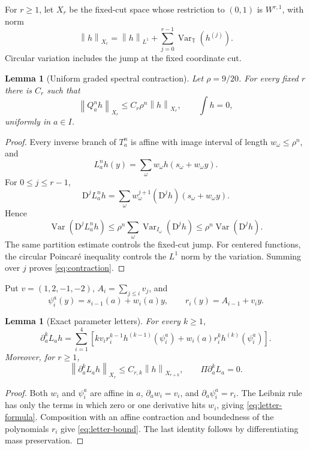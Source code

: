 \documentclass[11pt,reqno]{amsart}
\newtheorem{lemma}[theorem]{Lemma}
\theoremstyle{definition}
\theoremstyle{remark}
\newcommand{\D}{\mathrm D}
\newcommand{\T}{\mathbb T}
\newcommand{\Var}{\operatorname{Var}}
\newcommand{\norm}[1]{\left\lVert #1\right\rVert}
\begin{document}
For $r\ge1$, let $X_r$ be the fixed-cut space whose restriction to $(0,1)$ is
$W^{r,1}$, with norm
\begin{equation}\label{eq:Xr}
 \norm{h}_{X_r}=\norm{h}_{L^1}+
 \sum_{j=0}^{r-1}\Var_{\T}(h^{(j)}).
\end{equation}
Circular variation includes the jump at the fixed coordinate cut.

\begin{lemma}[Uniform graded spectral contraction]\label{lem:contraction}
Let $\rho=9/20$.  For every fixed $r$ there is $C_r$ such that
\begin{equation}\label{eq:contraction}
 \norm{Q_a^n h}_{X_r}\le C_r\rho^n\norm{h}_{X_r},
 \qquad \int h=0,
\end{equation}
uniformly in $a\in I$.
\end{lemma}

\begin{proof}
Every inverse branch of $T_a^n$ is affine with image interval of length
$w_\omega\le\rho^n$, and
\[
 L_a^n h(y)=\sum_{\omega}w_\omega h(s_\omega+w_\omega y).
\]
For $0\le j\le r-1$,
\[
 \D^jL_a^nh=
 \sum_\omega w_\omega^{j+1}
 (\D^j h)(s_\omega+w_\omega y).
\]
Hence
\[
 \Var(\D^jL_a^nh)
 \le \rho^n\sum_\omega
 \Var_{I_\omega}(\D^j h)
 \le \rho^n\Var(\D^j h).
\]
The same partition estimate controls the fixed-cut jump.  For centered
functions, the circular Poincar\'e inequality controls the $L^1$ norm by the
variation.  Summing over $j$ proves \eqref{eq:contraction}.
\end{proof}

Put $v=(1,2,-1,-2)$, $A_i=\sum_{j\le i}v_j$, and
\[
 \psi_i^a(y)=s_{i-1}(a)+w_i(a)y,
 \qquad
 r_i(y)=A_{i-1}+v_i y.
\]

\begin{lemma}[Exact parameter letters]\label{lem:letters}
For every $k\ge1$,
\begin{equation}\label{eq:letter-formula}
 \partial_a^kL_a h
 =\sum_{i=1}^4\left[
 kv_i r_i^{k-1}h^{(k-1)}(\psi_i^a)
 +w_i(a)r_i^k h^{(k)}(\psi_i^a)
 \right].
\end{equation}
Moreover, for $r\ge1$,
\begin{equation}\label{eq:letter-bound}
 \norm{\partial_a^kL_a h}_{X_r}
 \le C_{r,k}\norm{h}_{X_{r+k}},
 \qquad
 \Pi\partial_a^kL_a=0.
\end{equation}
\end{lemma}

\begin{proof}
Both $w_i$ and $\psi_i^a$ are affine in $a$,
$\partial_aw_i=v_i$, and $\partial_a\psi_i^a=r_i$.  The Leibniz rule has only
the terms in which zero or one derivative hits $w_i$, giving
\eqref{eq:letter-formula}.  Composition with an affine contraction and
boundedness of the polynomials $r_i$ give \eqref{eq:letter-bound}.  The last
identity follows by differentiating mass preservation.
\end{proof}
\end{document}
